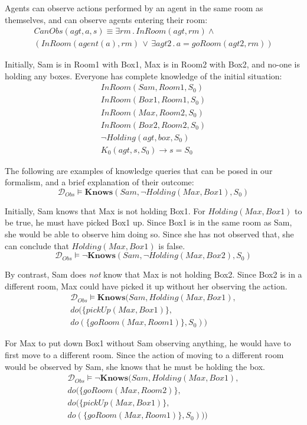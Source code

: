 \documentclass{ifaamas-submission}
\begin{document}
Agents can observe actions performed by an agent in the same room
as themselves, and can observe agents entering their room:\begin{multline*}
CanObs(agt,a,s)\equiv\exists rm\,.\, InRoom(agt,rm)\wedge\\
\left(InRoom(agent(a),rm)\,\vee\,\exists agt2\,.\, a=goRoom(agt2,rm)\right)\end{multline*}


Initially, Sam is in Room1 with Box1, Max is in Room2 with Box2, and
no-one is holding any boxes. Everyone has complete knowledge of the
initial situation:\begin{gather*}
InRoom(Sam,Room1,S_{0})\\
InRoom(Box1,Room1,S_{0})\\
InRoom(Max,Room2,S_{0})\\
InRoom(Box2,Room2,S_{0})\\
\neg Holding(agt,box,S_{0})\\
K_{0}(agt,s,S_{0})\rightarrow s=S_{0}\end{gather*}


The following are examples of knowledge queries that can be posed
in our formalism, and a brief explanation of their outcome:\[
\mathcal{D}_{Obs}\models\mathbf{Knows}(Sam,\neg Holding(Max,Box1),S_{0})\]


Initially, Sam knows that Max is not holding Box1. For $Holding(Max,Box1)$
to be true, he must have picked Box1 up. Since Box1 is in the same
room as Sam, she would be able to observe him doing so. Since she
has not observed that, she can conclude that $Holding(Max,Box1)$
is false.\[
\mathcal{D}_{Obs}\models\mathbf{\neg Knows}(Sam,\neg Holding(Max,Box2),S_{0})\]


By contrast, Sam does \emph{not} know that Max is not holding Box2.
Since Box2 is in a different room, Max could have picked it up without
her observing the action.\begin{multline*}
\mathcal{D}_{Obs}\models\mathbf{Knows}(Sam,Holding(Max,Box1),\\
do(\{ pickUp(Max,Box1)\},\\
do(\{ goRoom(Max,Room1)\},S_{0}))\end{multline*}


For Max to put down Box1 without Sam observing anything, he would
have to first move to a different room. Since the action of moving
to a different room would be observed by Sam, she knows that he must
be holding the box.\begin{multline*}
\mathcal{D}_{Obs}\models\mathbf{\neg Knows}(Sam,Holding(Max,Box1),\\
do(\{ goRoom(Max,Room2)\},\\
do(\{ pickUp(Max,Box1)\},\\
do(\{ goRoom(Max,Room1)\},S_{0})))\end{multline*}
\end{document}
